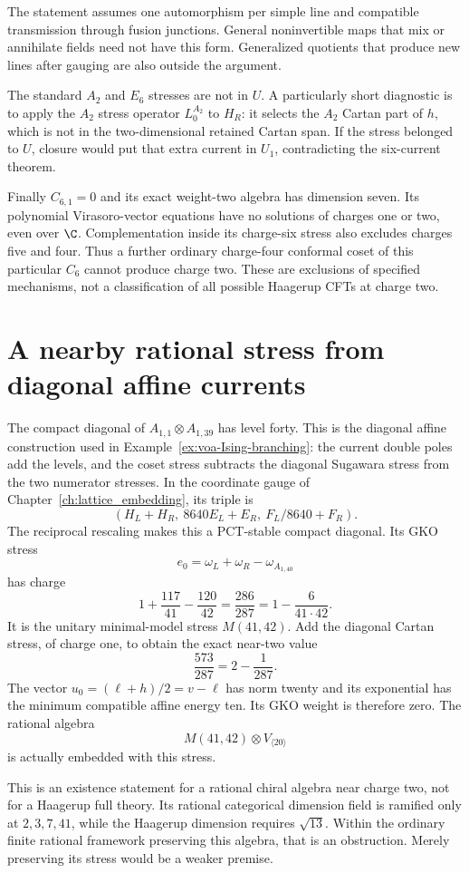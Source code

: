 The statement assumes one automorphism per simple line and compatible
transmission through fusion junctions. General noninvertible maps that
mix or annihilate fields need not have this form. Generalized quotients
that produce new lines after gauging are also outside the argument.

The standard $A_2$ and $E_6$ stresses are not in $U$. A particularly
short diagnostic is to apply the $A_2$ stress operator $L_0^{A_2}$
to $H_R$: it selects the $A_2$ Cartan part of $h$, which is not in
the two-dimensional retained Cartan span. If the stress belonged to
$U$, closure would put that extra current in $U_1$, contradicting the
six-current theorem.

Finally $C_{6,1}=0$ and its exact weight-two algebra has dimension
seven. Its polynomial Virasoro-vector equations have no solutions of
charges one or two, even over $\C$. Complementation inside its
charge-six stress also excludes charges five and four. Thus a further
ordinary charge-four conformal coset of this particular $C_6$ cannot
produce charge two. These are exclusions of specified mechanisms,
not a classification of all possible Haagerup CFTs at charge two.

\section{A nearby rational stress from diagonal affine currents}

The compact diagonal of $A_{1,1}\otimes A_{1,39}$ has level forty.
This is the diagonal affine construction used in
Example~\ref{ex:voa-Ising-branching}: the current double poles add
the levels, and the coset stress subtracts the diagonal Sugawara
stress from the two numerator stresses.
In the coordinate gauge of Chapter~\ref{ch:lattice_embedding}, its
triple is
\[
 (H_L+H_R,\ 8640E_L+E_R,\ F_L/8640+F_R).
\]
The reciprocal rescaling makes this a PCT-stable compact diagonal.
Its GKO stress
\[
 e_0=\omega_L+\omega_R-\omega_{A_{1,40}}
\]
has charge
\[
 1+\frac{117}{41}-\frac{120}{42}
 =\frac{286}{287}=1-\frac6{41\cdot42}.
\]
It is the unitary minimal-model stress $M(41,42)$.
Add the diagonal Cartan stress, of charge one, to obtain the exact
near-two value
\[
 \frac{573}{287}=2-\frac1{287}.
\]
The vector $u_0=(\ell+h)/2=v-\ell$ has norm twenty and its
exponential has the minimum compatible affine energy ten. Its GKO
weight is therefore zero. The rational algebra
\[
 M(41,42)\otimes V_{\langle20\rangle}
\]
is actually embedded with this stress.

This is an existence statement for a rational chiral algebra near
charge two, not for a Haagerup full theory. Its rational categorical
dimension field is ramified only at $2,3,7,41$, while the Haagerup
dimension requires $\sqrt{13}$. Within the ordinary finite rational
framework preserving this algebra, that is an obstruction. Merely
preserving its stress would be a weaker premise.

